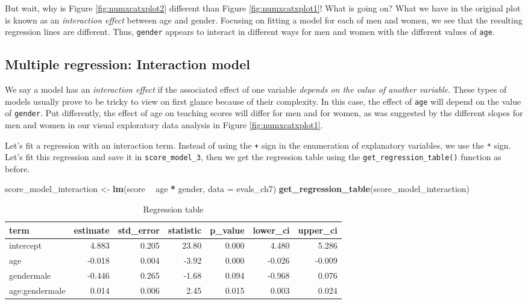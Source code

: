 \documentclass[12pt, krantz2,]{krantz}
\makeatletter
\newenvironment{Shaded}{\begin{snugshade}}{\end{snugshade}}
\newcommand{\DataTypeTok}[1]{\textcolor[rgb]{0.27,0.27,0.27}{#1}}
\newcommand{\KeywordTok}[1]{\textcolor[rgb]{0.27,0.27,0.27}{\textbf{#1}}}
\newcommand{\NormalTok}[1]{#1}
\newcommand{\OperatorTok}[1]{\textcolor[rgb]{0.43,0.43,0.43}{\textbf{#1}}}
\newcommand{\StringTok}[1]{\textcolor[rgb]{0.5,0.5,0.5}{#1}}
\newenvironment{kframe}{%
\medskip{}
\setlength{\fboxsep}{.8em}
 \def\at@end@of@kframe{}%
 \ifinner\ifhmode%
  \def\at@end@of@kframe{\end{minipage}}%
  \begin{minipage}{\columnwidth}%
 \fi\fi%
 \def\FrameCommand##1{\hskip\@totalleftmargin \hskip-\fboxsep
 \colorbox{shadecolor}{##1}\hskip-\fboxsep
     \hskip-\linewidth \hskip-\@totalleftmargin \hskip\columnwidth}%
 \MakeFramed {\advance\hsize-\width
   \@totalleftmargin\z@ \linewidth\hsize
   \@setminipage}}%
 {\par\unskip\endMakeFramed%
 \at@end@of@kframe}
\renewenvironment{Shaded}{\begin{kframe}}{\end{kframe}}
\makeatother
\begin{document}
But wait, why is Figure \ref{fig:numxcatxplot2} different than Figure \ref{fig:numxcatxplot1}! What is going on? What we have in the original plot is known as an \emph{interaction effect} between age and gender. Focusing on fitting a model for each of men and women, we see that the resulting regression lines are different. Thus, \texttt{gender} appears to interact in different ways for men and women with the different values of \texttt{age}.

\hypertarget{model4interactiontable}{%
\subsection{Multiple regression: Interaction model}\label{model4interactiontable}}

We say a model has an \emph{interaction effect} if the associated effect of one variable \emph{depends on the value of another variable}. These types of models usually prove to be tricky to view on first glance because of their complexity. In this case, the effect of \texttt{age} will depend on the value of \texttt{gender}. Put differently, the effect of age on teaching scores will differ for men and for women, as was suggested by the different slopes for men and women in our visual exploratory data analysis in Figure \ref{fig:numxcatxplot1}.

Let's fit a regression with an interaction term. Instead of using the \texttt{+} sign in the enumeration of explanatory variables, we use the \texttt{*} sign. Let's fit this regression and save it in \texttt{score\_model\_3}, then we get the regression table using the \texttt{get\_regression\_table()} function as before.

\begin{Shaded}
\begin{Highlighting}[]
\NormalTok{score_model_interaction <-}\StringTok{ }\KeywordTok{lm}\NormalTok{(score }\OperatorTok{~}\StringTok{ }\NormalTok{age }\OperatorTok{*}\StringTok{ }\NormalTok{gender, }\DataTypeTok{data =}\NormalTok{ evals_ch7)}
\KeywordTok{get_regression_table}\NormalTok{(score_model_interaction)}
\end{Highlighting}
\end{Shaded}

\begin{table}[H]

\caption{\label{tab:unnamed-chunk-222}Regression table}
\centering
\fontsize{10}{12}\selectfont
\begin{tabular}{lrrrrrr}
\toprule
term & estimate & std\_error & statistic & p\_value & lower\_ci & upper\_ci\\
\midrule
intercept & 4.883 & 0.205 & 23.80 & 0.000 & 4.480 & 5.286\\
age & -0.018 & 0.004 & -3.92 & 0.000 & -0.026 & -0.009\\
gendermale & -0.446 & 0.265 & -1.68 & 0.094 & -0.968 & 0.076\\
age:gendermale & 0.014 & 0.006 & 2.45 & 0.015 & 0.003 & 0.024\\
\bottomrule
\end{tabular}
\end{table}
\end{document}
